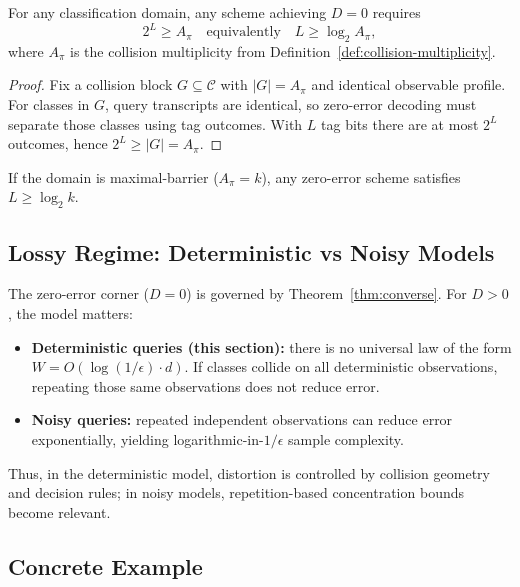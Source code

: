 \begin{theorem}[Converse]\label{thm:converse}
For any classification domain, any scheme achieving $D=0$ requires
\[
2^L \ge A_\pi
\quad\text{equivalently}\quad
L \ge \log_2 A_\pi,
\]
where $A_\pi$ is the collision multiplicity from Definition~\ref{def:collision-multiplicity}.
\end{theorem}

\begin{proof}
Fix a collision block $G \subseteq \mathcal{C}$ with $|G|=A_\pi$ and identical observable profile. For classes in $G$, query transcripts are identical, so zero-error decoding must separate those classes using tag outcomes. With $L$ tag bits there are at most $2^L$ outcomes, hence $2^L \ge |G| = A_\pi$.
\end{proof}

\begin{corollary}
\label{cor:max-barrier-converse}
If the domain is maximal-barrier ($A_\pi = k$), any zero-error scheme satisfies $L \ge \log_2 k$.
\end{corollary}

\subsection{Lossy Regime: Deterministic vs Noisy Models}

The zero-error corner ($D=0$) is governed by Theorem~\ref{thm:converse}. For $D>0$, the model matters:
\begin{itemize}
\item \textbf{Deterministic queries (this section):} there is no universal law of the form $W=O(\log(1/\epsilon)\cdot d)$. If classes collide on all deterministic observations, repeating those same observations does not reduce error.
\item \textbf{Noisy queries:} repeated independent observations can reduce error exponentially, yielding logarithmic-in-$1/\epsilon$ sample complexity.
\end{itemize}

Thus, in the deterministic model, distortion is controlled by collision geometry and decision rules; in noisy models, repetition-based concentration bounds become relevant.

\subsection{Concrete Example}

